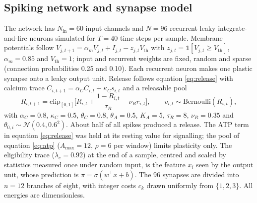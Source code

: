 \documentclass[12pt,a4paper]{article}
\begin{document}
\subsection*{Spiking network and synapse model}
The network has $N_{\mathrm{in}}=60$ input channels and $N=96$ recurrent leaky integrate-and-fire neurons simulated for $T=40$ time steps per sample. Membrane potentials follow $V_{j,t+1}=\alpha_{m}V_{j,t}+I_{j,t}-z_{j,t}V_{\mathrm{th}}$ with $z_{j,t}=\mathbb{1}[V_{j,t}\ge V_{\mathrm{th}}]$, $\alpha_{m}=0.85$ and $V_{\mathrm{th}}=1$; input and recurrent weights are fixed, random and sparse (connection probabilities 0.25 and 0.10). Each recurrent neuron makes one plastic synapse onto a leaky output unit. Release follows equation \eqref{eq:release} with calcium trace $C_{i,t+1}=\alpha_{C}C_{i,t}+\kappa_{C}s_{i,t}$ and a releasable pool
\begin{equation}
R_{i,t+1}=\mathrm{clip}_{[0,1]}\!\Big[R_{i,t}+\frac{1-R_{i,t}}{\tau_{R}}-\nu_{R}r_{i,t}\Big],\qquad v_{i,t}\sim\mathrm{Bernoulli}(R_{i,t}),
\label{eq:vesicle}
\end{equation}
with $\alpha_{C}=0.8$, $\kappa_{C}=0.5$, $\theta_{C}=0.8$, $\theta_{A}=0.5$, $K_{A}=5$, $\tau_{R}=8$, $\nu_{R}=0.35$ and $\theta_{0,i}\sim\mathcal N(0.4,0.6^{2})$. About half of all spikes produced a release. The ATP term in equation \eqref{eq:release} was held at its resting value for signalling; the pool of equation \eqref{eq:atp} ($A_{\max}=12$, $\rho=6$ per window) limits plasticity only. The eligibility trace ($\lambda_{e}=0.92$) at the end of a sample, centred and scaled by statistics measured once under random input, is the feature $x_{i}$ seen by the output unit, whose prediction is $\pi=\sigma(w^{\top}x+b)$. The 96 synapses are divided into $n=12$ branches of eight, with integer costs $c_{k}$ drawn uniformly from $\{1,2,3\}$. All energies are dimensionless.
\end{document}
